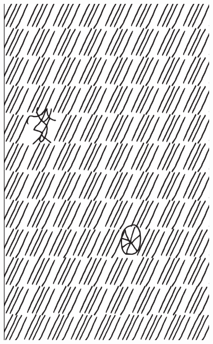 \makeatletter\@openrightfalse
\movetooddpage
\begin{absolutelynopagebreak}
\begin{vplace}
\begin{figure}[H]
\begin{adjustwidth}{-0.99cm}{}
  \centering
  \vspace*{-1.97cm}
  \hspace*{-0.65cm}
  \includegraphics[width=115mm]{./imgs/img4.pdf}  
  \hfill
\end{adjustwidth}

\thispagestyle{empty}

\end{figure}
\end{vplace}

\end{absolutelynopagebreak}

